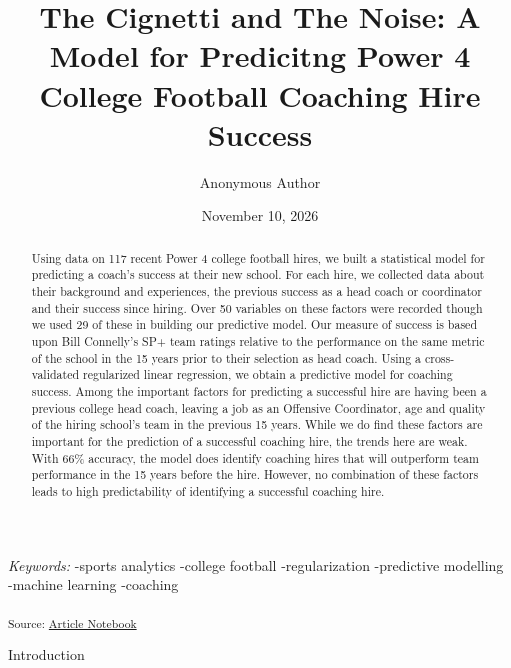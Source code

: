 \documentclass[
  12pt]{article}
\begin{document}
\def\spacingset#1{\renewcommand{\baselinestretch}%
{#1}\small\normalsize} \spacingset{1}



\date{November 10, 2026}
\title{\bf The Cignetti and The Noise: A Model for Predicitng Power 4
College Football Coaching Hire Success}
\author{
Anonymous Author\\
}
\maketitle

\bigskip
\bigskip
\begin{abstract}
Using data on 117 recent Power 4 college football hires, we built a
statistical model for predicting a coach's success at their new school.
For each hire, we collected data about their background and experiences,
the previous success as a head coach or coordinator and their success
since hiring. Over 50 variables on these factors were recorded though we
used 29 of these in building our predictive model. Our measure of
success is based upon Bill Connelly's SP+ team ratings relative to the
performance on the same metric of the school in the 15 years prior to
their selection as head coach. Using a cross-validated regularized
linear regression, we obtain a predictive model for coaching success.
Among the important factors for predicting a successful hire are having
been a previous college head coach, leaving a job as an Offensive
Coordinator, age and quality of the hiring school's team in the previous
15 years. While we do find these factors are important for the
prediction of a successful coaching hire, the trends here are weak. With
66\% accuracy, the model does identify coaching hires that will
outperform team performance in the 15 years before the hire. However, no
combination of these factors leads to high predictability of identifying
a successful coaching hire.
\end{abstract}

\noindent%
{\it Keywords:} -sports analytics -college football -regularization
-predictive modelling -machine learning -coaching
\vfill

\newpage
\spacingset{1.9} %


\textsubscript{Source:
\href{https://schuckers.github.io/cignetti-noise-paper/index.qmd.html}{Article
Notebook}}

Introduction
\end{document}
